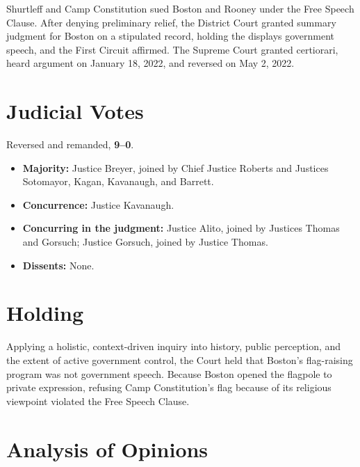 \documentclass[12pt]{article}
\begin{document}
Shurtleff and Camp Constitution sued Boston and Rooney under the Free Speech Clause. After denying preliminary relief, the District Court granted summary judgment for Boston on a stipulated record, holding the displays government speech, and the First Circuit affirmed. The Supreme Court granted certiorari, heard argument on January 18, 2022, and reversed on May 2, 2022.

\section{Judicial Votes}

Reversed and remanded, \textbf{9--0}.
\begin{itemize}
\item \textbf{Majority:} Justice Breyer, joined by Chief Justice Roberts and Justices Sotomayor, Kagan, Kavanaugh, and Barrett.
\item \textbf{Concurrence:} Justice Kavanaugh.
\item \textbf{Concurring in the judgment:} Justice Alito, joined by Justices Thomas and Gorsuch; Justice Gorsuch, joined by Justice Thomas.
\item \textbf{Dissents:} None.
\end{itemize}

\section{Holding}

Applying a holistic, context-driven inquiry into history, public perception, and the extent of active government control, the Court held that Boston's flag-raising program was not government speech. Because Boston opened the flagpole to private expression, refusing Camp Constitution's flag because of its religious viewpoint violated the Free Speech Clause.

\section{Analysis of Opinions}
\end{document}
